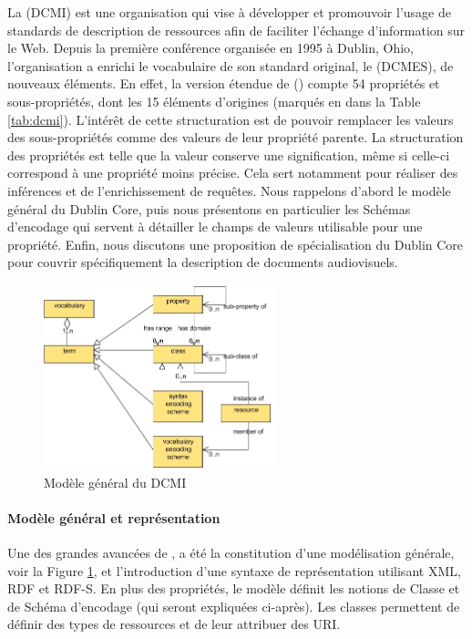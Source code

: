 La  (DCMI) est une organisation qui vise à développer et promouvoir l'usage de standards de description de ressources afin de faciliter l'échange d'information sur le Web.
Depuis la première conférence organisée en 1995 à Dublin, Ohio, l'organisation a enrichi le vocabulaire de son standard original, le  (DCMES), de nouveaux éléments. 
En effet, la version étendue de  (\cite{DCMIUsageBoard2010}) compte 54 propriétés et sous-propriétés, dont les 15 éléments d'origines (marqués en  dans la Table \ref{tab:dcmi}).
L'intérêt de cette structuration est de pouvoir remplacer les valeurs des sous-propriétés comme des valeurs de leur propriété parente. 
La structuration des propriétés est telle que la valeur conserve une signification, même si celle-ci correspond à une propriété moins précise. 
Cela sert notamment pour réaliser des inférences et de l'enrichissement de requêtes.
Nous rappelons d'abord le modèle général du Dublin Core, puis nous présentons en particulier les Schémas d'encodage qui servent à détailler le champs de valeurs utilisable pour une propriété.
Enfin, nous discutons une proposition de spécialisation du Dublin Core pour couvrir spécifiquement la description de documents audiovisuels.

\begin{figure}[ht!]
\centering
\includegraphics[width=0.6\textwidth]{images/vocabulary-model.jpg}
\caption{Modèle général du DCMI}
\label{img:dcmi-voc}
\end{figure}

\paragraph{Modèle général et représentation}
Une des grandes avancées de , a été la constitution d'une modélisation générale, voir la Figure \ref{img:dcmi-voc}, et l'introduction d'une syntaxe de représentation utilisant XML, RDF et RDF-S. 
En plus des propriétés, le modèle définit les notions de Classe et de Schéma d'encodage (qui seront expliquées ci-après). 
Les classes permettent de définir des types de ressources et de leur attribuer des URI. 

